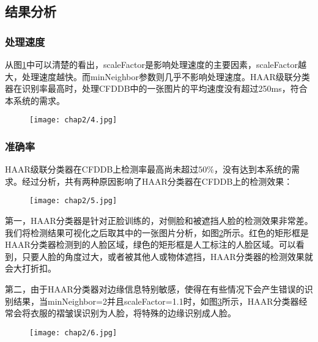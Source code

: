 \subsection{结果分析}

\subsubsection{处理速度}

从图\ref{fig:haartest:speed}中可以清楚的看出，scaleFactor是影响处理速度的主要因素，scaleFactor越大，处理速度越快。而minNeighbor参数则几乎不影响处理速度。HAAR级联分类器在识别率最高时，处理CFDDB中的一张图片的平均速度没有超过250ms，符合本系统的需求。

\begin{figure}[!htp]
	\centering
	\texttt{[image: chap2/4.jpg]}
	\label{fig:haartest:speed}
\end{figure}

\subsubsection{准确率}

HAAR级联分类器在CFDDB上检测率最高尚未超过$50\%$，没有达到本系统的需求。经过分析，共有两种原因影响了HAAR分类器在CFDDB上的检测效果：

\begin{figure}[!htp]
	\centering
	\texttt{[image: chap2/5.jpg]}
	\label{fig:haartest:acc}
\end{figure}

第一，HAAR分类器是针对正脸训练的，对侧脸和被遮挡人脸的检测效果非常差。我们将检测结果可视化之后取其中的一张图片分析，如图\ref{fig:haartest:acc}所示。红色的矩形框是HAAR分类器检测到的人脸区域，绿色的矩形框是人工标注的人脸区域。可以看到，只要人脸的角度过大，或者被其他人或物体遮挡，HAAR分类器的检测效果就会大打折扣。

第二，由于HAAR分类器对边缘信息特别敏感，使得在有些情况下会产生错误的识别结果，当minNeighbor=2并且scaleFactor=1.1时，如图\ref{fig:haartest:acc2}所示，HAAR分类器经常会将衣服的褶皱误识别为人脸，将特殊的边缘识别成人脸。

\begin{figure}[!htp]
	\centering
	\texttt{[image: chap2/6.jpg]}
	\label{fig:haartest:acc2}
\end{figure}

